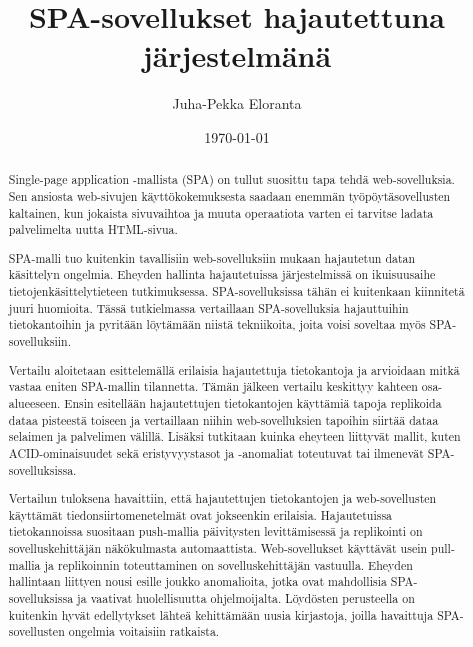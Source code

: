 \documentclass[finnish,twoside,censored,csm,sw-track-2018]{HYthesisML}
\title{SPA-sovellukset hajautettuna järjestelmänä}
\author{Juha-Pekka Eloranta}
\date{\today}
\begin{document}
\maketitle

\begin{abstract}

Single-page application -mallista (SPA) on tullut suosittu tapa tehdä web-sovelluksia. Sen ansiosta web-sivujen käyttökokemuksesta saadaan enemmän työpöytäsovellusten kaltainen, kun jokaista sivuvaihtoa ja muuta operaatiota varten ei tarvitse ladata palvelimelta uutta HTML-sivua.

SPA-malli tuo kuitenkin tavallisiin web-sovelluksiin mukaan hajautetun datan käsittelyn ongelmia. Eheyden hallinta hajautetuissa järjestelmissä on ikuisuusaihe tietojenkäsittelytieteen tutkimuksessa. SPA-sovelluksissa tähän ei kuitenkaan kiinnitetä juuri huomioita. Tässä tutkielmassa vertaillaan SPA-sovelluksia hajauttuihin tietokantoihin ja pyritään löytämään niistä tekniikoita, joita voisi soveltaa myös SPA-sovelluksiin.

Vertailu aloitetaan esittelemällä erilaisia hajautettuja tietokantoja ja arvioidaan mitkä vastaa eniten SPA-mallin tilannetta. Tämän jälkeen vertailu keskittyy kahteen osa-alueeseen. Ensin esitellään hajautettujen tietokantojen käyttämiä tapoja replikoida dataa pisteestä toiseen ja vertaillaan niihin web-sovelluksien tapoihin siirtää dataa selaimen ja palvelimen välillä. Lisäksi tutkitaan kuinka eheyteen liittyvät mallit, kuten ACID-ominaisuudet sekä eristyvyystasot ja -anomaliat toteutuvat tai ilmenevät SPA-sovelluksissa.

Vertailun tuloksena havaittiin, että hajautettujen tietokantojen ja web-sovellusten käyttämät tiedonsiirtomenetelmät ovat jokseenkin erilaisia. Hajautetuissa tietokannoissa suositaan push-mallia päivitysten levittämisessä ja replikointi on sovelluskehittäjän näkökulmasta automaattista. Web-sovellukset käyttävät usein pull-mallia ja replikoinnin toteuttaminen on sovelluskehittäjän vastuulla. Eheyden hallintaan liittyen nousi esille joukko anomalioita, jotka ovat mahdollisia SPA-sovelluksissa ja vaativat huolellisuutta ohjelmoijalta. Löydösten perusteella on kuitenkin hyvät edellytykset lähteä kehittämään uusia kirjastoja, joilla havaittuja SPA-sovellusten ongelmia voitaisiin ratkaista.

\end{abstract}
\end{document}
